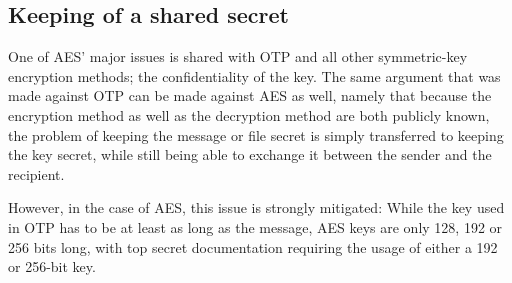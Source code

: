 \documentclass[12pt]{report}
\begin{document}
\subsection{Keeping of a shared secret}
One of AES' major issues is shared with OTP and all other symmetric-key encryption methods; the confidentiality of the key. The same argument that was made against OTP can be made against AES as well, namely that because the encryption method as well as the decryption method are both publicly known, the problem of keeping the message or file secret is simply transferred to keeping the key secret, while still being able to exchange it between the sender and the recipient.

However, in the case of AES, this issue is strongly mitigated: While the key used in OTP has to be at least as long as the message, AES keys are only 128, 192 or 256 bits long, with top secret documentation requiring the usage of either a 192 or 256-bit key\cite{CNSSPolicy}.

\printbibliography
\end{document}
